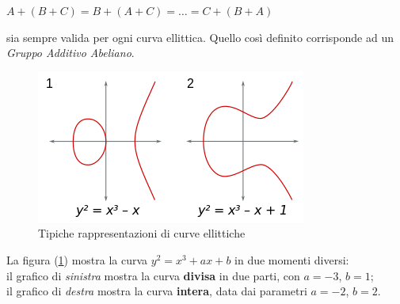 \documentclass[a4paper,12pt]{tesiinfo}
\begin{document}
\begin{center}
$A+(B+C)=B+(A+C)= \ldots =C+(B+A)$
\end{center}
sia sempre valida per ogni curva ellittica. Quello cos\`i definito corrisponde ad un \textit{Gruppo Additivo Abeliano}.
\begin{figure}[H]
 \includegraphics[width=\textwidth,center]{CommonEC}
 \caption{Tipiche rappresentazioni di curve ellittiche}
 \label{CommonEC}
\end{figure}
La figura (\ref{CommonEC}) mostra la curva $y^2 = x^3 + ax+b$ in due momenti diversi: 
\\il grafico di \textit{sinistra} mostra la curva \textbf{divisa} in due parti, con $a=-3$, $b=1$; 
\\il grafico di \textit{destra} mostra la curva \textbf{intera}, data dai parametri $a=-2$, $b=2$.
%
%
%
%
%
%
%
%
%
%
%
\end{document}
